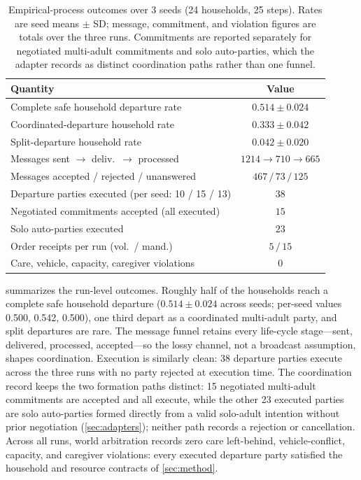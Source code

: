 \documentclass[journal]{IEEEtran}
\begin{document}
\begin{table}[t]
\centering
\footnotesize
\caption{Empirical-process outcomes over 3 seeds (24 households, 25 steps).
Rates are seed means $\pm$ SD; message, commitment, and violation figures are
totals over the three runs. Commitments are reported separately for negotiated
multi-adult commitments and solo auto-parties, which the adapter records as
distinct coordination paths rather than one funnel.}
\label{tab:e1-process}
\begin{tabular}{@{}lc@{}}
\toprule
Quantity & Value \\
\midrule
Complete safe household departure rate & $0.514 \pm 0.024$ \\
Coordinated-departure household rate & $0.333 \pm 0.042$ \\
Split-departure household rate & $0.042 \pm 0.020$ \\
Messages sent $\rightarrow$ deliv.\ $\rightarrow$ processed &
$1214 \rightarrow 710 \rightarrow 665$ \\
Messages accepted / rejected / unanswered & $467\,/\,73\,/\,125$ \\
Departure parties executed (per seed: 10 / 15 / 13) & $38$ \\
Negotiated commitments accepted (all executed) & $15$ \\
Solo auto-parties executed & $23$ \\
Order receipts per run (vol.\ / mand.) & $5\,/\,15$ \\
Care, vehicle, capacity, caregiver violations & $0$ \\
\bottomrule
\end{tabular}
\end{table}

 summarizes the run-level outcomes. Roughly half of the
households reach a complete safe household departure ($0.514 \pm 0.024$ across seeds;
per-seed values 0.500, 0.542, 0.500), one third depart as a coordinated
multi-adult party, and split departures are rare. The message funnel
retains every life-cycle stage---sent, delivered, processed, accepted---so the
lossy channel, not a broadcast assumption, shapes coordination. Execution is
similarly clean: 38 departure parties execute across the three runs with no
party rejected at execution time. The coordination record keeps the two
formation paths distinct: 15 negotiated multi-adult commitments are accepted
and all execute, while the other 23 executed parties are solo auto-parties
formed directly from a valid solo-adult intention without prior negotiation
(\cref{sec:adapters}); neither path records a rejection or cancellation.
Across all
runs, world arbitration records zero care left-behind, vehicle-conflict,
capacity, and caregiver violations: every executed departure party satisfied
the household and resource contracts of \cref{sec:method}.
\end{document}
